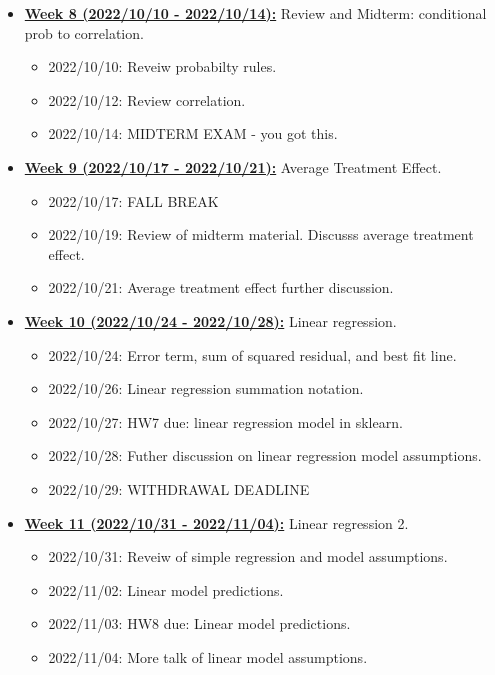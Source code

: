 \documentclass[11pt]{article}
\begin{document}
\begin{itemize}
  \item \underline{\textbf{Week 8 (2022/10/10 - 2022/10/14):}} Review and Midterm: conditional prob to correlation.
  \begin{itemize}
    \item 2022/10/10: Reveiw probabilty rules. 
    \item 2022/10/12: Review correlation. 
    \item 2022/10/14: MIDTERM EXAM - you got this. 
  \end{itemize}

  \item \underline{\textbf{Week 9 (2022/10/17 - 2022/10/21):}} Average Treatment Effect.
  \begin{itemize}
    \item 2022/10/17: FALL BREAK 
    \item 2022/10/19: Review of midterm material. Discusss average treatment effect. 
    \item 2022/10/21: Average treatment effect further discussion. 
  \end{itemize}

  \item \underline{\textbf{Week 10 (2022/10/24 - 2022/10/28):}} Linear regression. 
  \begin{itemize}
    \item 2022/10/24: Error term, sum of squared residual, and best fit line. 
    \item 2022/10/26: Linear regression summation notation. 
    \item 2022/10/27: HW7 due: linear regression model in sklearn.
    \item 2022/10/28: Futher discussion on linear regression model assumptions. 
    \item 2022/10/29: WITHDRAWAL DEADLINE
  \end{itemize}


  \item \underline{\textbf{Week 11 (2022/10/31 - 2022/11/04):}} Linear regression 2. 
  \begin{itemize}
    \item 2022/10/31: Reveiw of simple regression and model assumptions.
    \item 2022/11/02: Linear model predictions.
    \item 2022/11/03: HW8 due: Linear model predictions. 
    \item 2022/11/04: More talk of linear model assumptions. 
  \end{itemize}



\end{itemize}
\end{document}
